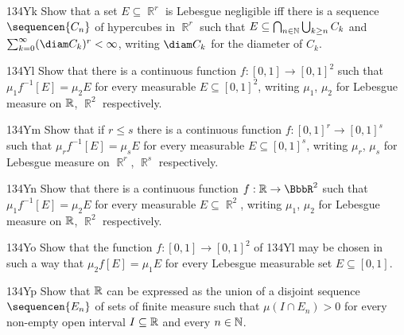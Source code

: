 {\spheader 134Yk Show that a set $E\subseteq\BbbR^r$ is Lebesgue
negligible iff there is a sequence $\sequencen{C_n}$ of hypercubes in
$\BbbR^r$ such that $E\subseteq\bigcap_{n\in\Bbb N}\bigcup_{k\ge n}C_k$
and $\sum_{k=0}^{\infty}(\diam C_k)^r<\infty$, writing $\diam C_k$ for
the diameter of $C_k$.
     
\spheader 134Yl Show that there is a continuous function
$f:[0,1]\to[0,1]^2$ such that $\mu_1f^{-1}[E]=\mu_2E$ for every
measurable $E\subseteq[0,1]^2$, writing $\mu_1$, $\mu_2$ for Lebesgue
measure on $\Bbb R$, $\BbbR^2$ respectively.   
     
\spheader 134Ym Show that if $r\le s$ there is a continuous
function $f:[0,1]^r\to[0,1]^s$ such that $\mu_rf^{-1}[E]=\mu_sE$ for
every measurable $E\subseteq[0,1]^s$, writing $\mu_r$, $\mu_s$ for
Lebesgue measure on $\BbbR^r$, $\BbbR^s$ respectively.
     
\spheader 134Yn Show that there is a continuous function
$f:\Bbb R\to\BbbR^2$ such that $\mu_1f^{-1}[E]=\mu_2E$ for every
measurable
$E\subseteq\BbbR^2$, writing $\mu_1$, $\mu_2$ for Lebesgue measure on
$\Bbb R$, $\BbbR^2$ respectively.
     
\spheader 134Yo Show that the function $f:[0,1]\to[0,1]^2$ of
134Yl may be chosen in such a way that $\mu_2f[E]=\mu_1E$ for every
Lebesgue measurable set $E\subseteq[0,1]$.   
     
\spheader 134Yp Show that $\Bbb R$ can be expressed as the union
of a disjoint
sequence $\sequencen{E_n}$ of sets of finite measure such that
$\mu(I\cap E_n)>0$ for every non-empty open interval $I\subseteq\Bbb R$
and every $n\in\Bbb N$.
     
}
